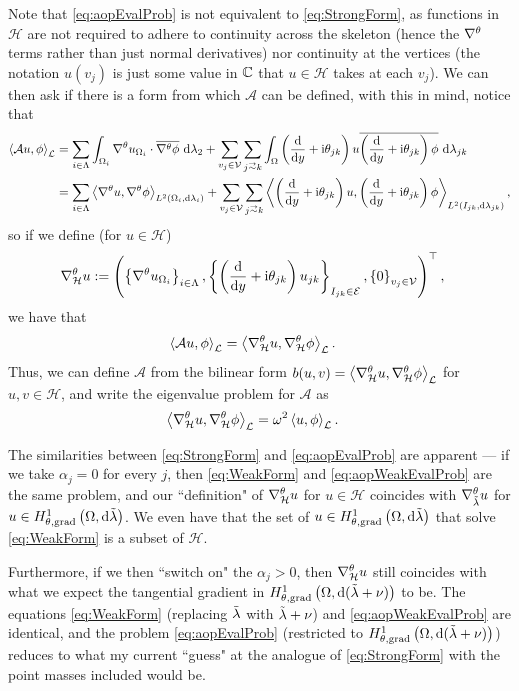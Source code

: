 Note that \eqref{eq:aopEvalProb} is not equivalent to \eqref{eq:StrongForm}, as functions in $\mathcal{H}$ are not required to adhere to continuity across the skeleton (hence the $\nabla^{\theta}$ terms rather than just normal derivatives) nor continuity at the vertices (the notation $u(v_j)$ is just some value in $\mathbb{C}$ that $u\in\mathcal{H}$ takes at each $v_j$).
We can then ask if there is a form from which $\mathcal{A}$ can be defined, with this in mind, notice that
\begin{align*}
	\ip{\mathcal{A} u}{\phi}_{\mathcal{L}} &= \sum_{i\in\Lambda}\integral{\ddom_i}{ \tgrad u_{\ddom_i}\cdot\overline{\tgrad\phi} }{\lambda_2}
	+ \sum_{v_j\in\vertSet}\sum_{j\conLeft k}\integral{\ddom}{ \bracs{\diff{}{y}+\rmi\qm_{jk}}u\overline{\bracs{\diff{}{y}+\rmi\qm_{jk}}\phi} }{\lambda_{jk}} \\
	&= \sum_{i\in\Lambda}\ip{ \tgrad u }{ \tgrad\phi }_{\ltwo{\ddom_i}{\lambda_i}}
	+ \sum_{v_j\in\vertSet}\sum_{j\conLeft k}\ip{ \bracs{\diff{}{y}+\rmi\qm_{jk}}u }{ \bracs{\diff{}{y}+\rmi\qm_{jk}}\phi }_{\ltwo{I_{jk}}{\lambda_{jk}}},
\end{align*}
so if we define (for $u\in\mathcal{H}$)
\begin{align*}
	\nabla^{\theta}_{\mathcal{H}} u &:= \left( \left\{ \nabla^{\theta} u_{\Omega_i} \right\}_{i\in\Lambda}, \left\{ \left( \dfrac{\mathrm{d}}{\mathrm{d}y}+\mathrm{i}\theta_{jk} \right)u_{jk} \right\}_{I_{jk}\in\mathcal{E}}, \left\{ 0 \right\}_{v_j\in\mathcal{V}} \right)^\top,
\end{align*}
we have that
\begin{align*}
	\left\langle \mathcal{A} u , \phi \right\rangle_{\mathcal{L}} &= \left\langle \nabla^{\theta}_{\mathcal{H}} u , \nabla^{\theta}_{\mathcal{H}}\phi \right\rangle_{\mathcal{L}}.
\end{align*}
Thus, we can define $\mathcal{A}$ from the bilinear form $b(u,v) = \left\langle \nabla^{\theta}_{\mathcal{H}} u , \nabla^{\theta}_{\mathcal{H}}\phi \right\rangle_{\mathcal{L}}$ for $u,v\in\mathcal{H}$, and write the eigenvalue problem for $\mathcal{A}$ as
\begin{align} \label{eq:aopWeakEvalProb}
	\left\langle \nabla^{\theta}_{\mathcal{H}} u , \nabla^{\theta}_{\mathcal{H}}\phi \right\rangle_{\mathcal{L}} &= \omega^2\left\langle u , \phi \right\rangle_{\mathcal{L}}.
\end{align}

The similarities between \eqref{eq:StrongForm} and \eqref{eq:aopEvalProb} are apparent --- if we take $\alpha_j=0$ for every $j$, then \eqref{eq:WeakForm} and \eqref{eq:aopWeakEvalProb} are the same problem, and our ``definition" of $\nabla^{\theta}_{\mathcal{H}} u$ for $u\in\mathcal{H}$ coincides with $\nabla^{\theta}_{\tilde{\lambda}}u$ for $u\in H^1_{\theta, \mathrm{grad}}\left( \Omega, \mathrm{d}\tilde{\lambda} \right)$.
We even have that the set of $u\in H^1_{\theta, \mathrm{grad}}\left( \Omega, \mathrm{d}\tilde{\lambda} \right)$ that solve \eqref{eq:WeakForm} is a subset of $\mathcal{H}$.

Furthermore, if we then ``switch on" the $\alpha_j>0$, then $\nabla^{\theta}_{\mathcal{H}} u$ still coincides with what we expect the tangential gradient in $H^1_{\theta, \mathrm{grad}}\left( \Omega, \mathrm{d}(\tilde{\lambda}+\nu) \right)$ to be.
The equations \eqref{eq:WeakForm} (replacing $\tilde{\lambda}$ with $\tilde{\lambda}+\nu$) and \eqref{eq:aopWeakEvalProb} are identical, and the problem \eqref{eq:aopEvalProb} (restricted to $H^1_{\theta, \mathrm{grad}}\left( \Omega, \mathrm{d}(\tilde{\lambda}+\nu) \right)$) reduces to what my current ``guess" at the analogue of \eqref{eq:StrongForm} with the point masses included would be.